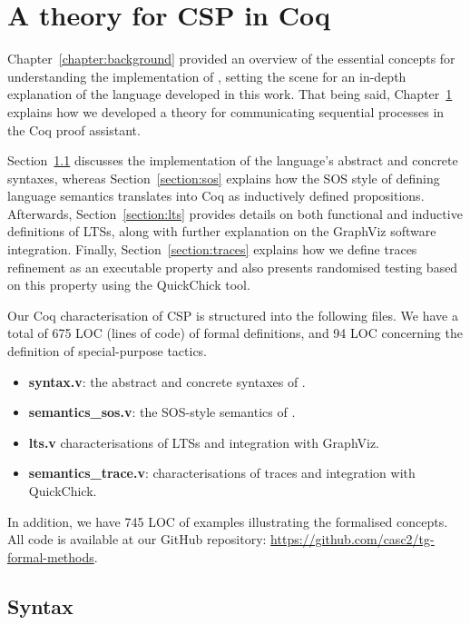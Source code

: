 \chapter{A theory for CSP in Coq}
\label{chapter:csp_coq}

Chapter~\ref{chapter:background} provided an overview of the essential concepts for understanding the implementation of \CSPcoq{}, setting the scene for an in-depth explanation of the language developed in this work. That being said, Chapter~\ref{chapter:csp_coq} explains how we developed a theory for communicating sequential processes in the Coq proof assistant.

Section~\ref{section:syntax} discusses the implementation of the language's abstract and concrete syntaxes, whereas Section~\ref{section:sos} explains how the SOS style of defining language semantics translates into Coq as inductively defined propositions. Afterwards, Section~\ref{section:lts} provides details on both functional and inductive definitions of LTSs, along with further explanation on the GraphViz software integration. Finally, Section~\ref{section:traces} explains how we define traces refinement as an executable property and also presents randomised testing based on this property using the QuickChick tool.

Our Coq characterisation of CSP is structured into the following files. We have a total of 675 LOC (lines of code) of formal definitions, and 94 LOC concerning the definition of special-purpose tactics.

\begin{itemize}
	\item \textbf{syntax.v}: the abstract and concrete syntaxes of \CSPcoq{}.
	\item \textbf{semantics\_sos.v}: the SOS-style semantics of \CSPcoq{}.
	\item \textbf{lts.v} characterisations of LTSs and integration with GraphViz.
	\item \textbf{semantics\_trace.v}: characterisations of traces and integration with QuickChick.
\end{itemize}

In addition, we have 745 LOC of examples illustrating the formalised concepts. All code is available at our GitHub repository: \url{https://github.com/casc2/tg-formal-methods}.

\section{Syntax}
\label{section:syntax}

